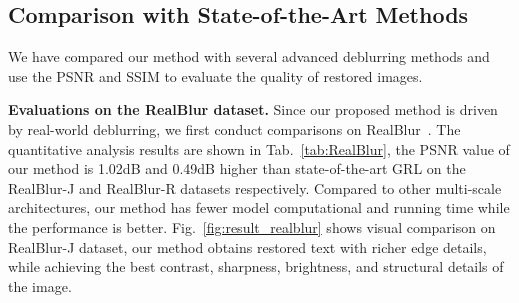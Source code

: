 \documentclass[10pt,twocolumn,letterpaper]{article}
\begin{document}
\subsection{Comparison with State-of-the-Art Methods}
We have compared our method with several advanced deblurring methods and use the PSNR and SSIM to evaluate the quality of restored images.

\noindent\textbf{Evaluations on the RealBlur dataset.} Since our proposed method is driven by real-world deblurring, we first conduct comparisons on RealBlur~\cite{rim2020real}. The quantitative analysis results are shown in Tab.~\ref{tab:RealBlur}, the PSNR value of our method is 1.02dB and 0.49dB higher than state-of-the-art GRL on the RealBlur-J and RealBlur-R datasets respectively. Compared to other multi-scale architectures, our method has fewer model computational and running time while the performance is better. Fig.~\ref{fig:result_realblur} shows visual comparison on RealBlur-J dataset, our method obtains restored text with richer edge details, while achieving the best contrast, sharpness, brightness, and structural details of the image.
\end{document}
